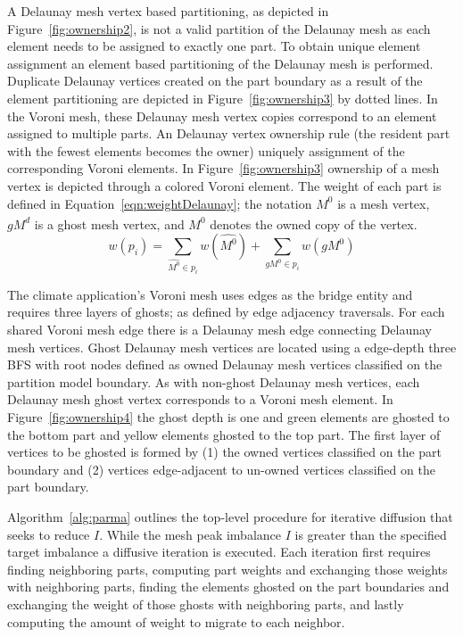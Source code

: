 \documentclass[a4paper]{article}
\begin{document}
A Delaunay mesh vertex based partitioning, as depicted in
Figure~\ref{fig:ownership2}, is not a valid partition of the Delaunay mesh as
each element needs to be assigned to exactly one part.
To obtain unique element assignment an element based partitioning of the
Delaunay mesh is performed.
Duplicate Delaunay vertices created on the part boundary as a result of the
element partitioning are depicted in Figure~\ref{fig:ownership3} by dotted
lines.
In the Voroni mesh, these Delaunay mesh vertex copies correspond to an element 
assigned to multiple parts.
An Delaunay vertex ownership rule (the resident part with the fewest
elements becomes the owner) uniquely assignment of the corresponding Voroni 
elements.
In Figure~\ref{fig:ownership3} ownership of a mesh vertex is depicted through a
colored Voroni element.
The weight of each part is defined in Equation~\ref{eqn:weightDelaunay}; the 
notation $M^0$ is a mesh vertex, $gM^d$ is a ghost mesh vertex, and $\hat{M^0}$ 
denotes the owned copy of the vertex.
\begin{equation}
\label{eqn:weightDelaunay}
w(p_i) = \sum_{\hat{M^0} \in p_i}w(\hat{M^0}) + \sum_{gM^0 \in p_i}w(gM^0)
\end{equation}

The climate application's Voroni mesh uses edges as the bridge entity and
requires three layers of ghosts; as defined by edge adjacency traversals.
For each shared Voroni mesh edge there is a Delaunay mesh edge connecting
Delaunay mesh vertices.
Ghost Delaunay mesh vertices are located using a edge-depth three BFS with root
nodes defined as owned Delaunay mesh vertices classified on the partition model
boundary.
As with non-ghost Delaunay mesh vertices, each Delaunay mesh ghost vertex
corresponds to a Voroni mesh element.
In Figure~\ref{fig:ownership4} the ghost depth is one and green elements are
ghosted to the bottom part and yellow elements ghosted to the top part.
The first layer of vertices to be ghosted is formed by (1) the owned vertices
classified on the part boundary and (2) vertices edge-adjacent to un-owned
vertices classified on the part boundary.

Algorithm~\ref{alg:parma} outlines the top-level procedure for iterative
diffusion that seeks to reduce $I$.
While the mesh peak imbalance $I$ is greater than the specified target imbalance
a diffusive iteration is executed.
Each iteration first requires finding neighboring parts, computing part weights
and exchanging those weights with neighboring parts, finding the elements
ghosted on the part boundaries and exchanging the weight of those ghosts with
neighboring parts, and lastly computing the amount of weight to migrate to each
neighbor.
\end{document}
